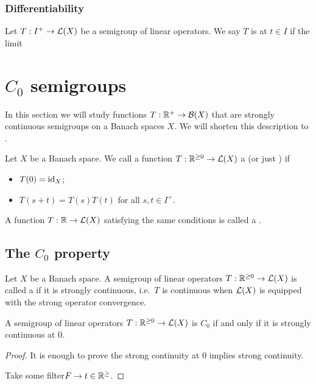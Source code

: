 \subsection{Differentiability}
\begin{definition}
Let $T: I^+ \to \operatorname{\mathcal{L}}(X)$ be a semigroup of linear operators. We say $T$ is  at $t\in I$ if the limit
\[  \]
\end{definition}


\chapter{$C_0$ semigroups}
In this section we will study functions $T: \mathbb{R}^+\to \operatorname{\mathcal{B}}(X)$ that are strongly continuous semigroups on a Banach spaces $X$. We will shorten this description to .

\begin{definition}
Let $X$ be a Banach space. We call a function $T: \mathbb{R}^{\geq 0} \to \operatorname{\mathcal{L}}(X)$ a  (or just ) if
\begin{itemize}
\item $T(0) = \operatorname{id}_X$;
\item $T(s+t) = T(s)T(t)$ for all $s,t \in I^+$.
\end{itemize}
A function $T: \mathbb{R} \to \operatorname{\mathcal{L}}(X)$ satisfying the same conditions is called a .
\end{definition}

\section{The $C_0$ property}
\begin{definition}
Let $X$ be a Banach space. A semigroup of linear operators $T: \mathbb{R}^{\geq 0} \to \operatorname{\mathcal{L}}(X)$ is called a  if it is strongly continuous, i.e.\ $T$ is continuous when $\operatorname{\mathcal{L}}(X)$ is equipped with the strong operator convergence.
\end{definition}

\begin{lemma}
A semigroup of linear operators $T: \mathbb{R}^{\geq 0} \to \operatorname{\mathcal{L}}(X)$ is $C_0$ \textup{if and only if} it is strongly continuous at $0$.
\end{lemma}
\begin{proof}
It is enough to prove the strong continuity at $0$ implies strong continuity.

Take some filter$F\to t\in\mathbb{R}^{\geq}$.
\end{proof}

